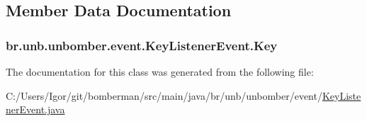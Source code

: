 \subsection{Member Data Documentation}
\hypertarget{classbr_1_1unb_1_1unbomber_1_1event_1_1_key_listener_event_a7f44c45e47d6d8f49d9a8952e08725a4}{
\subsubsection[{Key}]{ br.\+unb.\+unbomber.\+event.\+Key\+Listener\+Event.\+Key\hspace{0.3cm}{\ttfamily [private]}}}\label{classbr_1_1unb_1_1unbomber_1_1event_1_1_key_listener_event_a7f44c45e47d6d8f49d9a8952e08725a4}


The documentation for this class was generated from the following file\+:\begin{DoxyCompactItemize}
\item 
C\+:/\+Users/\+Igor/git/bomberman/src/main/java/br/unb/unbomber/event/\hyperlink{_key_listener_event_8java}{Key\+Listener\+Event.\+java}\end{DoxyCompactItemize}
